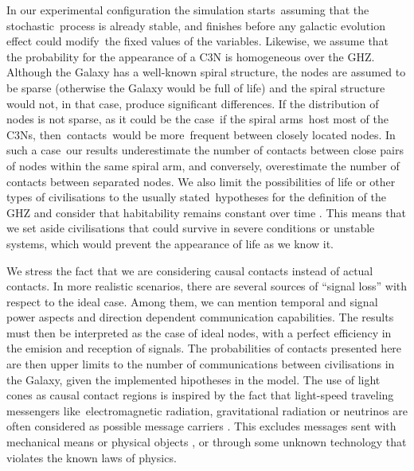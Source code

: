 \documentclass[crop]{CSLB}
\newcommand{\ceti}{C3N}
\newcommand{\cetis}{C3Ns}
\begin{document}
In our experimental configuration the simulation starts assuming that the
stochastic process is already stable, and finishes before any galactic
evolution effect could modify the fixed values of the variables.
%
Likewise, we assume that the probability for the appearance of a \ceti{} is
homogeneous over the GHZ.
%
Although the Galaxy has a well-known spiral structure, the nodes are assumed
to be sparse (otherwise the Galaxy would be full of life) and the spiral
structure would not, in that case, produce significant differences.
%
If the distribution of nodes is not sparse, as it could be the case if the
spiral arms host most of the \cetis{}, then contacts would be more frequent
between closely located nodes.
%
In such a case our results underestimate the number of contacts between
close pairs of nodes within the same spiral arm, and conversely, overestimate
the number of contacts between separated nodes.
%
We also limit the possibilities of life or other types of civilisations to the
usually stated hypotheses for the definition of the GHZ
\citep{dayal_habitability_2016, gonzalez_galactic_2001,
lineweaver_galactic_2004, gonzalez_habitable_2005, morrison_extending_2015,
haqq-misra_evolution_2019, rahvar_cosmic_2016, gobat_evolution_2016,
rahvar_cosmic_2016} and consider that habitability remains constant over time
\citep[see, however, ][]{gonzalez_habitable_2005, dayal_habitability_2016,
gobat_evolution_2016}.
%
This means that we set aside civilisations that could survive in severe
conditions or unstable systems, which would prevent the appearance of life as
we know it.  



We stress the fact that we are
considering causal contacts instead of actual contacts.
%
In more realistic scenarios, there are several sources of ``signal loss'' with
respect to the ideal case.
%
Among them, we can mention temporal and signal power aspects and direction
dependent communication capabilities.
%
The results must then be interpreted as the case of ideal nodes, with a perfect
efficiency in the emision and reception of signals.
%
The probabilities of contacts presented here are then upper limits to the
number of communications between civilisations in the Galaxy, given the
implemented hipotheses in the model.
%
The use of light cones as causal contact regions is inspired by the fact that
light-speed traveling messengers like electromagnetic radiation, gravitational
radiation or neutrinos are often considered as possible message carriers
\citep{hippke_interstellar_2017, wright_how_2018}.
%
This excludes messages sent with mechanical means or physical objects
\citep[e.g., ][]{Armstrong2013, barlow_galactic_2013}, or through some unknown
technology that violates the known laws of physics.
\end{document}

